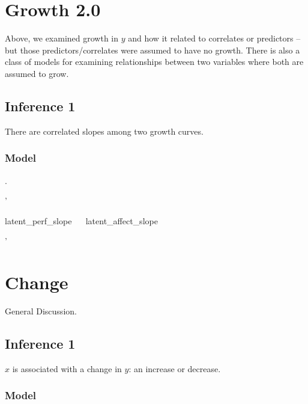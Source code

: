 \documentclass[english,,man]{apa6}
\newenvironment{Shaded}{\begin{snugshade}}{\end{snugshade}}
\newcommand{\StringTok}[1]{\textcolor[rgb]{0.31,0.60,0.02}{#1}}
\theoremstyle{definition}
\theoremstyle{definition}
\theoremstyle{definition}
\theoremstyle{remark}
\begin{document}
\hypertarget{growth-2.0}{%
\section{Growth 2.0}\label{growth-2.0}}

Above, we examined growth in \(y\) and how it related to correlates or
predictors -- but those predictors/correlates were assumed to have no
growth. There is also a class of models for examining relationships
between two variables where both are assumed to grow.

\hypertarget{inference-1-2}{%
\subsection{Inference 1}\label{inference-1-2}}

There are correlated slopes among two growth curves.

\hypertarget{model-7}{%
\subsubsection{Model}\label{model-7}}

.

\begin{Shaded}
\begin{Highlighting}[]
\StringTok{'}

\StringTok{latent_perf_slope ~~ latent_affect_slope}

\StringTok{'}
\end{Highlighting}
\end{Shaded}

\hypertarget{change}{%
\section{Change}\label{change}}

General Discussion.

\hypertarget{inference-1-3}{%
\subsection{Inference 1}\label{inference-1-3}}

\(x\) is associated with a change in \(y\): an increase or decrease.

\hypertarget{model-8}{%
\subsubsection{Model}\label{model-8}}
\end{document}
